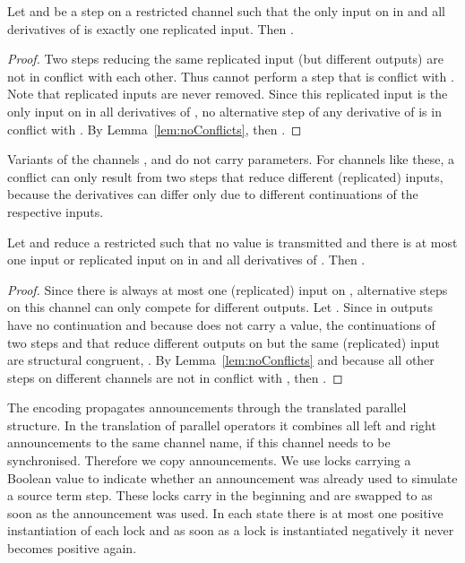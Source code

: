 \documentclass[]{eptcs}
\begin{document}
\begin{prop}
	Let  and  be a step on a restricted channel  such that the only input on  in  and all derivatives of  is exactly one replicated input.
	Then .
	\label{prop:auxStepsForward}
\end{prop}

\begin{proof}
	Two steps reducing the same replicated input (but different outputs) are not in conflict with each other. Thus  cannot perform a step that is conflict with . Note that replicated inputs are never removed. Since this replicated input is the only input on  in all derivatives of , no alternative step of any derivative of  is in conflict with . By Lemma~\ref{lem:noConflicts}, then .
\end{proof}

Variants of the channels , and  do not carry parameters. For channels like these, a conflict can only result from two steps that reduce different (replicated) inputs, because the derivatives can differ only due to different continuations of the respective inputs.

\begin{prop}
	Let  and  reduce a restricted  such that no value is transmitted and there is at most one input or replicated input on  in  and all derivatives of .
	Then .
	\label{prop:auxStepsReq}
\end{prop}

\begin{proof}
	Since there is always at most one (replicated) input on , alternative steps on this channel can only compete for different outputs. Let . Since in  outputs have no continuation and because  does not carry a value, the continuations of two steps  and  that reduce different outputs on  but the same (replicated) input are structural congruent, \ie .
	By Lemma~\ref{lem:noConflicts} and because all other steps on different channels are not in conflict with , then .
\end{proof}

The encoding propagates announcements through the translated parallel structure. In the translation of parallel operators it combines all left and right announcements \wrt to the same channel name, if this channel needs to be synchronised. Therefore we copy announcements.
We use locks carrying a Boolean value to indicate whether an announcement was already used to simulate a source term step. These locks carry  in the beginning and are swapped to  as soon as the announcement was used. In each state there is at most one positive instantiation of each lock and as soon as a lock is instantiated negatively it never becomes positive again.
\end{document}
